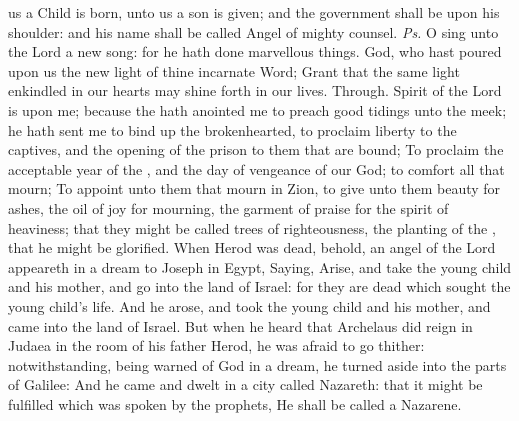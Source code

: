 
\properantiphonfix

\introit
{} us a Child is born, unto us a son is given; and the government shall be upon his shoulder: and his name shall be called Angel of mighty counsel. \textit{Ps.} O sing unto the Lord a new song: for he hath done marvellous things.
\collect
{} God, who hast poured upon us the new light of thine incarnate Word; Grant that the same light enkindled in our hearts may shine forth in our lives. Through.
 Spirit of the Lord  is upon me; because the  hath anointed me to preach good tidings unto the meek; he hath sent me to bind up the brokenhearted, to proclaim liberty to the captives, and the opening of the prison to them that are bound; To proclaim the acceptable year of the , and the day of vengeance of our God; to comfort all that mourn; To appoint unto them that mourn in Zion, to give unto them beauty for ashes, the oil of joy for mourning, the garment of praise for the spirit of heaviness; that they might be called trees of righteousness, the planting of the , that he might be glorified.
 When Herod was dead, behold, an angel of the Lord appeareth in a dream to Joseph in Egypt, Saying, Arise, and take the young child and his mother, and go into the land of Israel: for they are dead which sought the young child's life. And he arose, and took the young child and his mother, and came into the land of Israel. But when he heard that Archelaus did reign in Judaea in the room of his father Herod, he was afraid to go thither: notwithstanding, being warned of God in a dream, he turned aside into the parts of Galilee: And he came and dwelt in a city called Nazareth: that it might be fulfilled which was spoken by the prophets, He shall be called a Nazarene.
